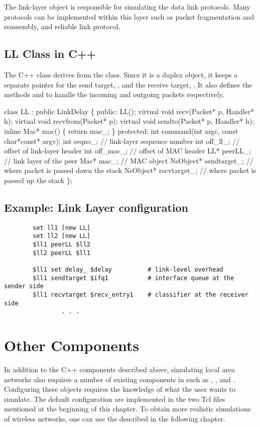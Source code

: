 The link-layer object is responsible for simulating the data link
protocols.  Many protocols can be implemented within this layer such as
packet fragmentation and reassembly, and reliable link protocol.

\subsection{LL Class in C++}
\label{sec:llcplus}

The C++ class  derives from the  class.  Since
it is a duplex object, it keeps a separate pointer for the send target,
, and the receive target, .  It also
defines the methods  and  to handle the
incoming and outgoing packets respectively.

\begin{program}
   class LL : public LinkDelay \{
   public:
        LL();
        virtual void recv(Packet* p, Handler* h);
        virtual void recvfrom(Packet* p);
        virtual void sendto(Packet* p, Handler* h);
        inline Mac* mac() \{ return mac_; \}
   protected:
        int command(int argc, const char*const* argv);
        int seqno_;		// link-layer sequence number
        int off_ll_;		// offset of link-layer header
        int off_mac_;		// offset of MAC header
        LL* peerLL_;		// link layer of the peer
        Mac* mac_;		// MAC object
        NsObject* sendtarget_;	// where packet is passed down the stack
        NsObject* recvtarget_;	// where packet is passed up the stack
   \};
\end{program}

\subsection{Example: Link Layer configuration}
\label{ex:linklayer}

\begin{verbatim}
        set ll1 [new LL]
        set ll2 [new LL]
        $ll1 peerLL $ll2
        $ll2 peerLL $ll1

        $ll1 set delay_ $delay          # link-level overhead
        $ll1 sendtarget $ifq1           # interface queue at the sender side
        $ll1 recvtarget $recv_entry1    # classifier at the receiver side
                . . .
\end{verbatim}


\section{Other Components}
\label{sec:lan_others}

In addition to the C++ components described above, simulating local area
networks also requires a number of existing components in \ns such as
, , and .  Configuring these
objects requires the knowledge of what the user wants to simulate.  The
default configuration are implemented in the two Tcl files mentioned at
the beginning of this chapter.  To obtain more realistic simulations of
wireless networks, one can use the  described in the
following chapter.

%
